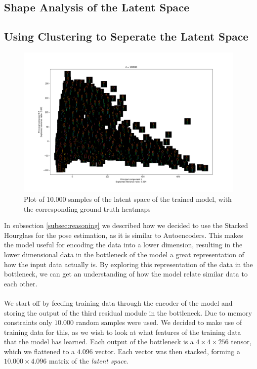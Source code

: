 \documentclass[./main.tex]{subfiles}
\begin{document}
\subsection{Shape Analysis of the Latent Space}
\clearpage
\subsection{Using Clustering to Seperate the Latent Space}
\begin{figure}[t]
    \centering
    \includegraphics[width = \textwidth]{entities/latent_space_all_skeletons.png}
    \caption{Plot of $10.000$ samples of the latent space of the trained model, with the corresponding ground truth heatmaps}
    \label{fig:latent_space_all_skeletons}
\end{figure}
In subsection \ref{subsec:reasoning} we described how we decided to use the Stacked Hourglass for the pose estimation, as it is similar to Autoencoders. This makes the model useful for encoding the data into a lower dimension, resulting in the lower dimensional data in the bottleneck of the model a great representation of how the input data actually is. By exploring this representation of the data in the bottleneck, we can get an understanding of how the model relate similar data to each other.
\\
\\
We start off by feeding training data through the encoder of the model and storing the output of the third residual module in the bottleneck. Due to memory constraints only $10.000$ random samples were used. We decided to make use of training data for this, as we wish to look at what features of the training data that the model has learned. Each output of the bottleneck is a $4 \times 4 \times 256$ tensor, which we flattened to a $4.096$ vector. Each vector was then stacked, forming a $10.000 \times 4.096$ matrix of the \textit{latent space}.
\end{document}
